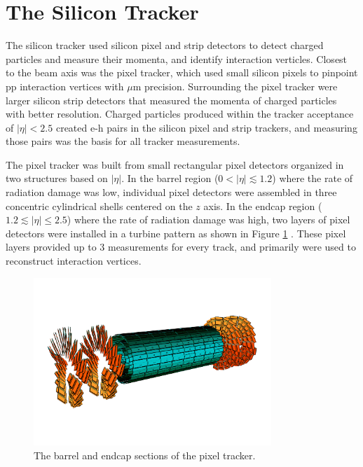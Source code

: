 \section{The Silicon Tracker}
\label{sec:siTrackerDescription}
The silicon tracker used silicon pixel and strip detectors to detect charged particles and measure their momenta, 
and identify interaction verticles.  Closest 
to the beam axis was the pixel tracker, which used small silicon pixels to pinpoint pp interaction vertices 
with $\mu$m precision.  Surrounding the pixel tracker were larger silicon strip detectors that measured the 
momenta of charged particles with better resolution.  Charged particles produced within the tracker acceptance of $|\eta| < 2.5$ created 
e-h pairs in the silicon pixel and strip trackers, and measuring those pairs was the basis for all tracker 
measurements.

The pixel tracker was built from small rectangular pixel detectors organized in two 
structures based on $|\eta|$.  In the barrel region ($0 < |\eta| \lesssim 1.2$) where the rate of radiation damage was 
low, individual pixel detectors were assembled in three concentric cylindrical shells centered on the $z$ axis.  In 
the endcap region ($1.2 \lesssim |\eta| \leq 2.5$) where the rate of radiation damage was high, two layers of pixel detectors were 
installed in a turbine pattern as shown in Figure \ref{fig:pixelTracker} \cite{pixelCommissioning}.  These pixel 
layers provided up to 3 measurements for every track, and primarily were used to reconstruct interaction 
vertices.

\begin{figure}[ht]
	\centering
	\includegraphics[width=0.8\textwidth]{figures/pixelDetectorSchematic.png}
	\caption{The barrel and endcap sections of the pixel tracker.}
	\label{fig:pixelTracker}
\end{figure}


